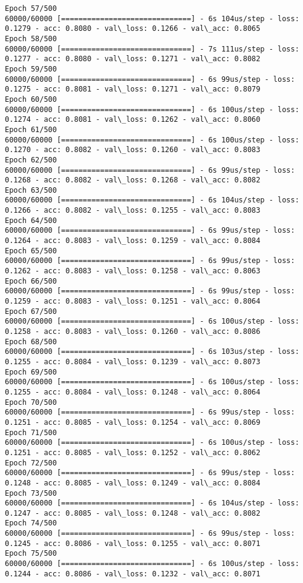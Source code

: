 \documentclass[11pt]{article}
\begin{document}
\begin{Verbatim}[commandchars=\\\{\}]
Epoch 57/500
60000/60000 [==============================] - 6s 104us/step - loss: 0.1279 - acc: 0.8080 - val\_loss: 0.1266 - val\_acc: 0.8065
Epoch 58/500
60000/60000 [==============================] - 7s 111us/step - loss: 0.1277 - acc: 0.8080 - val\_loss: 0.1271 - val\_acc: 0.8082
Epoch 59/500
60000/60000 [==============================] - 6s 99us/step - loss: 0.1275 - acc: 0.8081 - val\_loss: 0.1271 - val\_acc: 0.8079
Epoch 60/500
60000/60000 [==============================] - 6s 100us/step - loss: 0.1274 - acc: 0.8081 - val\_loss: 0.1262 - val\_acc: 0.8060
Epoch 61/500
60000/60000 [==============================] - 6s 100us/step - loss: 0.1270 - acc: 0.8082 - val\_loss: 0.1260 - val\_acc: 0.8083
Epoch 62/500
60000/60000 [==============================] - 6s 99us/step - loss: 0.1268 - acc: 0.8082 - val\_loss: 0.1268 - val\_acc: 0.8082
Epoch 63/500
60000/60000 [==============================] - 6s 104us/step - loss: 0.1266 - acc: 0.8082 - val\_loss: 0.1255 - val\_acc: 0.8083
Epoch 64/500
60000/60000 [==============================] - 6s 99us/step - loss: 0.1264 - acc: 0.8083 - val\_loss: 0.1259 - val\_acc: 0.8084
Epoch 65/500
60000/60000 [==============================] - 6s 99us/step - loss: 0.1262 - acc: 0.8083 - val\_loss: 0.1258 - val\_acc: 0.8063
Epoch 66/500
60000/60000 [==============================] - 6s 99us/step - loss: 0.1259 - acc: 0.8083 - val\_loss: 0.1251 - val\_acc: 0.8064
Epoch 67/500
60000/60000 [==============================] - 6s 100us/step - loss: 0.1258 - acc: 0.8083 - val\_loss: 0.1260 - val\_acc: 0.8086
Epoch 68/500
60000/60000 [==============================] - 6s 103us/step - loss: 0.1255 - acc: 0.8084 - val\_loss: 0.1239 - val\_acc: 0.8073
Epoch 69/500
60000/60000 [==============================] - 6s 100us/step - loss: 0.1255 - acc: 0.8084 - val\_loss: 0.1248 - val\_acc: 0.8064
Epoch 70/500
60000/60000 [==============================] - 6s 99us/step - loss: 0.1251 - acc: 0.8085 - val\_loss: 0.1254 - val\_acc: 0.8069
Epoch 71/500
60000/60000 [==============================] - 6s 100us/step - loss: 0.1251 - acc: 0.8085 - val\_loss: 0.1252 - val\_acc: 0.8062
Epoch 72/500
60000/60000 [==============================] - 6s 99us/step - loss: 0.1248 - acc: 0.8085 - val\_loss: 0.1249 - val\_acc: 0.8084
Epoch 73/500
60000/60000 [==============================] - 6s 104us/step - loss: 0.1247 - acc: 0.8085 - val\_loss: 0.1248 - val\_acc: 0.8082
Epoch 74/500
60000/60000 [==============================] - 6s 99us/step - loss: 0.1245 - acc: 0.8086 - val\_loss: 0.1255 - val\_acc: 0.8071
Epoch 75/500
60000/60000 [==============================] - 6s 100us/step - loss: 0.1244 - acc: 0.8086 - val\_loss: 0.1232 - val\_acc: 0.8071

\end{Verbatim}
\end{document}
